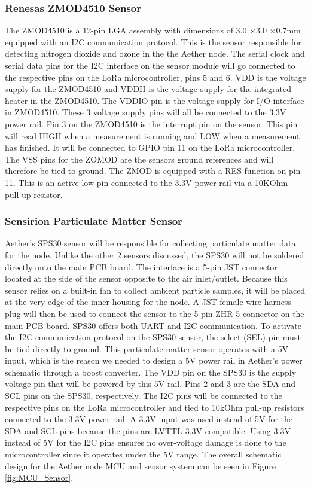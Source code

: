 \subsubsection{Renesas ZMOD4510 Sensor}
The ZMOD4510 is a 12-pin LGA assembly with dimensions of 3.0 ×3.0 ×0.7mm equipped with an I2C communication protocol. This is the sensor responsible for detecting nitrogen dioxide and ozone in the the Aether node. The serial clock and serial data pins for the I2C interface on the sensor module will go connected to the respective pins on the LoRa microcontroller, pins 5 and 6. VDD is the voltage supply for the ZMOD4510 and VDDH is the voltage supply for the integrated heater in the ZMOD4510. The VDDIO pin is the voltage supply for I/O-interface in ZMOD4510. These 3 voltage supply pins will all be connected to the 3.3V power rail. Pin 3 on the ZMOD4510 is the interrupt pin on the sensor. This pin will read HIGH when a measurement is running and LOW when a measurement has finished. It will be connected to GPIO pin 11 on the LoRa microcontroller. The VSS pins for the ZOMOD are the sensors ground references and will therefore be tied to ground. The ZMOD is equipped with a RES function on pin 11. This is an  active low pin connected to the 3.3V power rail via a 10KOhm pull-up resistor. 

\subsubsection{Sensirion Particulate Matter Sensor}
Aether's SPS30 sensor will be responsible for collecting particulate matter data for the node. Unlike the other 2 sensors discussed, the SPS30 will not be soldered directly onto the main PCB board. The interface is a 5-pin JST connector located at the side of the sensor opposite to the air inlet/outlet. Because this sensor relies on a built-in fan to collect ambient particle samples, it will be placed at the very edge of the inner housing for the node. A JST female wire harness plug will then be used to connect the sensor to the 5-pin ZHR-5 connector on the main PCB board. SPS30 offers both UART and I2C communication. To activate the I2C communication protocol on the SPS30 sensor, the select (SEL) pin must be tied directly to ground. This particulate matter sensor operates with a 5V input, which is the reason we needed to design a 5V power rail in Aether's power schematic through a boost converter. The VDD pin on the SPS30 is the supply voltage pin that will be powered by this 5V rail. Pins 2 and 3 are the SDA and SCL pins on the SPS30, respectively. The I2C pins will be connected to the respective pins on the LoRa microcontroller and tied to 10kOhm pull-up resistors connected to the 3.3V power rail. A 3.3V input was used instead of 5V for the SDA and SCL pins because the pins are LVTTL 3.3V compatible. Using 3.3V instead of 5V for the I2C pins ensures no over-voltage damage is done to the microcontroller since it operates under the 5V range. The overall schematic design for the Aether node MCU and sensor system can be seen in Figure \ref{fig:MCU_Sensor}.

